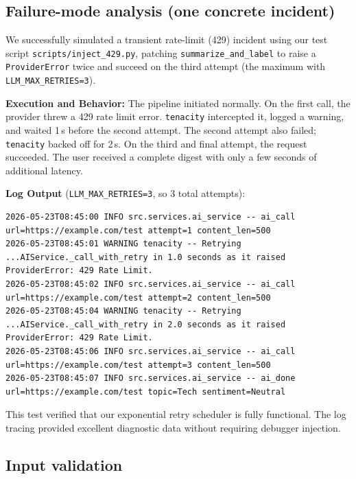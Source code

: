 \documentclass[11pt,a4paper]{article}
\begin{document}
\subsection{Failure-mode analysis (one concrete incident)}

We successfully simulated a transient rate-limit (429) incident using our test script \texttt{scripts/inject\_429.py}, patching \texttt{summarize\_and\_label} to raise a \texttt{ProviderError} twice and succeed on the third attempt (the maximum with \texttt{LLM\_MAX\_RETRIES=3}).

\textbf{Execution and Behavior:}
The pipeline initiated normally. On the first call, the provider threw a 429 rate limit error. \texttt{tenacity} intercepted it, logged a warning, and waited 1\,s before the second attempt. The second attempt also failed; \texttt{tenacity} backed off for 2\,s. On the third and final attempt, the request succeeded. The user received a complete digest with only a few seconds of additional latency.

\textbf{Log Output} (\texttt{LLM\_MAX\_RETRIES=3}, so 3 total attempts):
\begin{lstlisting}[basicstyle=\ttfamily\scriptsize,numbers=none,mathescape=false]
2026-05-23T08:45:00 INFO src.services.ai_service -- ai_call url=https://example.com/test attempt=1 content_len=500
2026-05-23T08:45:01 WARNING tenacity -- Retrying ...AIService._call_with_retry in 1.0 seconds as it raised ProviderError: 429 Rate Limit.
2026-05-23T08:45:02 INFO src.services.ai_service -- ai_call url=https://example.com/test attempt=2 content_len=500
2026-05-23T08:45:04 WARNING tenacity -- Retrying ...AIService._call_with_retry in 2.0 seconds as it raised ProviderError: 429 Rate Limit.
2026-05-23T08:45:06 INFO src.services.ai_service -- ai_call url=https://example.com/test attempt=3 content_len=500
2026-05-23T08:45:07 INFO src.services.ai_service -- ai_done url=https://example.com/test topic=Tech sentiment=Neutral
\end{lstlisting}

This test verified that our exponential retry scheduler is fully functional. The log tracing provided excellent diagnostic data without requiring debugger injection.

\subsection{Input validation}
\end{document}
